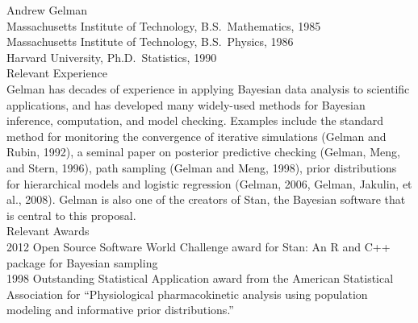 {\sc Andrew Gelman}
\\[2pt]
Massachusetts Institute of Technology, B.S.\ Mathematics, 1985 \\
Massachusetts Institute of Technology, B.S.\ Physics, 1986 \\
Harvard University, Ph.D.\ Statistics, 1990
\\

\noindent
{\sc Relevant Experience}
\\[2pt]
Gelman has decades of experience in applying Bayesian data analysis to
scientific applications, and has developed many widely-used methods
for Bayesian inference, computation, and model checking. Examples
include the standard method for monitoring the convergence of
iterative simulations (Gelman and Rubin, 1992), a seminal paper on
posterior predictive checking (Gelman, Meng, and Stern, 1996), path
sampling (Gelman and Meng, 1998), prior distributions for hierarchical
models and logistic regression (Gelman, 2006, Gelman, Jakulin, et al.,
2008). Gelman is also one of the creators of Stan, the Bayesian
software that is central to this proposal.
\\

\noindent
{\sc Relevant Awards}
\\[2pt]
2012 Open Source Software World Challenge award for Stan: An R and C++
package for Bayesian sampling
\\
1998 Outstanding Statistical Application award from the American
Statistical Association for ``Physiological pharmacokinetic analysis
using population modeling and informative prior distributions.''
\\

